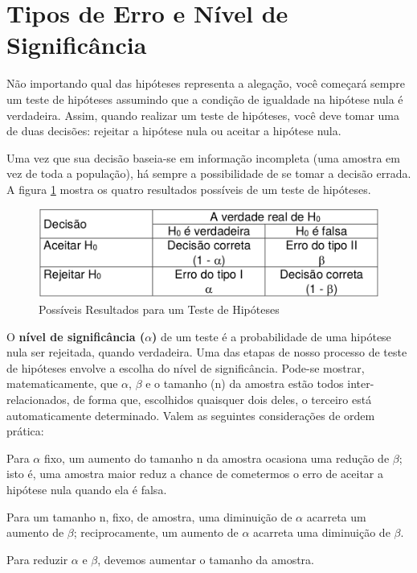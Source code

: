 \section{Tipos de Erro e Nível de Significância}

Não importando qual das hipóteses representa a alegação, você começará sempre um teste de hipóteses assumindo que a condição de igualdade na hipótese nula é verdadeira. Assim, quando realizar um teste de hipóteses, você deve tomar uma de duas decisões: rejeitar a hipótese nula ou aceitar a hipótese nula.

Uma vez que sua decisão baseia-se em informação incompleta (uma amostra em vez de toda a população), há sempre a possibilidade de se tomar a decisão errada. A figura \ref{fig:resultados-teste-hipoteses} mostra os quatro resultados possíveis de um teste de hipóteses.

\begin{figure}[h]
	\center
	\caption{Possíveis Resultados para um Teste de Hipóteses}	
	\label{fig:resultados-teste-hipoteses}
	\includegraphics[scale=1.7]{testes-hipoteses/resultados-teste-hipoteses.png}
\end{figure}

O \textbf{nível de significância (\(\alpha\))} de um teste é a probabilidade de uma hipótese nula ser rejeitada, quando verdadeira. Uma das etapas de nosso processo de teste de hipóteses envolve a escolha do nível de significância. Pode-se mostrar, matematicamente, que \(\alpha\), \(\beta\) e o tamanho (n) da amostra estão todos inter-relacionados, de forma que, escolhidos quaisquer dois deles, o terceiro está
automaticamente determinado. Valem as seguintes considerações de ordem prática:
\begin{alineas}
\item Para \(\alpha\) fixo, um aumento do tamanho n da amostra ocasiona uma redução
de \(\beta\); isto é, uma amostra maior reduz a chance de cometermos o erro de aceitar a hipótese nula quando ela é falsa.
\item Para um tamanho n, fixo, de amostra, uma diminuição de \(\alpha\) acarreta um
aumento de \(\beta\); reciprocamente, um aumento de \(\alpha\) acarreta uma diminuição de \(\beta\).
\item Para reduzir \(\alpha\) e \(\beta\), devemos aumentar o tamanho da amostra.
\end{alineas}

